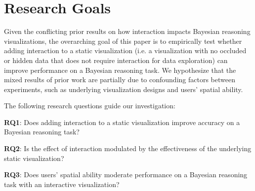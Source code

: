 \section{Research Goals}
Given the conflicting prior results on how interaction impacts Bayesian reasoning visualizations, the overarching goal of this paper is to empirically test whether adding interaction to a static visualization (i.e. a visualization with no occluded or hidden data that does not require interaction for data exploration) can improve performance on a Bayesian reasoning task. We hypothesize that the mixed results of prior work are partially due to confounding factors between experiments, such as underlying visualization designs and users' spatial ability. %

The following research questions guide our investigation:
\begin{compacthang}
	\item \textbf{RQ1}: Does adding interaction to a static visualization improve accuracy on a Bayesian reasoning task? 
	\item \textbf{RQ2}: Is the effect of interaction modulated by the effectiveness of the underlying static visualization? 
	\item \textbf{RQ3}: Does users' spatial ability moderate performance on a Bayesian reasoning task with an interactive visualization?   
\end{compacthang}


